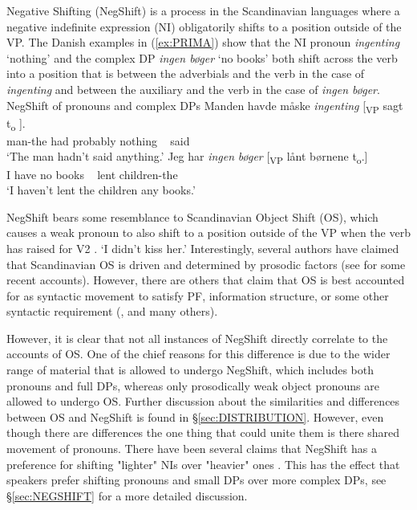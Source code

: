 \documentclass[12pt, letterpaper]{article}
\begin{document}
Negative Shifting (NegShift) is a process in the Scandinavian languages where a negative indefinite expression (NI) obligatorily shifts to a position outside of the VP. The Danish examples in (\ref{ex:PRIMA}) show that the NI pronoun \textit{ingenting} `nothing' and the complex DP \textit{ingen bøger} `no books' both shift across the verb into a position that is between the adverbials and the verb in the case of \textit{ingenting} and between the auxiliary and the verb in the case of \textit{ingen bøger}.
	\ea NegShift of pronouns and complex DPs\label{ex:PRIMA}
		\ea
		\gll Manden havde måske \textit{ingenting} [\textsubscript{VP} sagt t\textsubscript{o} ].\\
		man-the had probably nothing ~ said\\
		\glt `The man hadn't said anything.'
		\ex 
		\gll Jeg har \textit{ingen} \textit{bøger} [\textsubscript{VP} lånt børnene t\textsubscript{o}.]\\
		I have no books ~ lent children-the\\
		\glt `I haven't lent the children any books.'
		\z
	\z 

NegShift bears some resemblance to Scandinavian Object Shift (OS), which causes a weak pronoun to also shift to a position outside of the VP when the verb has raised for V2 \citep{holmbergWordOrderSyntactic1986,holmbergRemarksHolmbergGeneralization1999}.
	 
	\glt `I didn't kiss her.'   
	\z  
Interestingly, several authors have claimed that Scandinavian OS is driven and determined by prosodic factors (see \cite{erteschik-shirSoundPatternsSyntax2005,erteschik-shirScandinavianObjectShift2017,erteschik-shirVariationMainlandScandinavian2019,brinkerhoffMATCHINGPhrasesNorwegian2020} for some recent accounts). However, there are others that claim that OS is best accounted for as syntactic movement to satisfy PF, information structure, or some other syntactic requirement (\cite{holmbergRemarksHolmbergGeneralization1999,thrainssonObjectShiftScrambling2001,bentzenObjectShiftSpoken2013,sichelFeaturalLifeNominals2020}, and many others). 

However, it is clear that not all instances of NegShift directly correlate to the accounts of OS. One of the chief reasons for this difference is due to the wider range of material that is allowed to undergo NegShift, which includes both pronouns and full DPs, whereas only prosodically weak object pronouns are allowed to undergo OS. Further discussion about the similarities and differences between OS and NegShift is found in §\ref{sec:DISTRIBUTION}. However, even though there are differences the one thing that could unite them is there shared movement of pronouns. There have been several claims that NegShift has a preference for shifting "lighter" NIs over "heavier" ones \citep{christensenInterfacesNegationSyntax2005,penkaNegativeIndefinites2011}. This has the effect that speakers prefer shifting pronouns and small DPs over more complex DPs, see §\ref{sec:NEGSHIFT} for a more detailed discussion.
\end{document}

